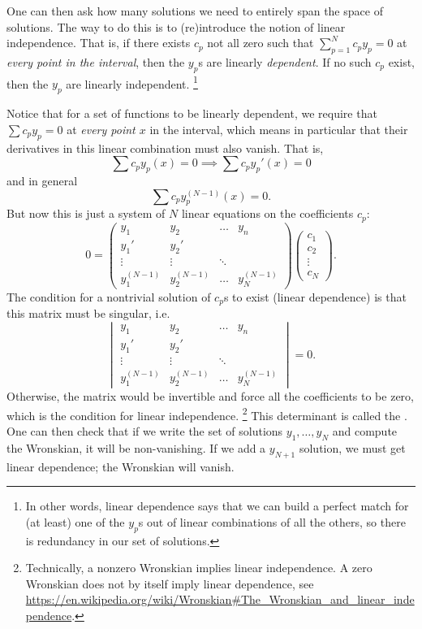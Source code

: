 One can then ask how many solutions we need to entirely span the space of solutions. The way to do this is to (re)introduce the notion of linear independence. That is, if there exists $c_p$ not all zero such that $\sum_{p=1}^N c_p y_p=0$ at \emph{every point in the interval}, then the $y_p$s are linearly \emph{dependent}. If no such $c_p$ exist, then the $y_p$ are linearly independent.%
    \footnote{In other words, linear dependence says that we can build a perfect match for (at least) one of the $y_p$s out of linear combinations of all the others, so there is redundancy in our set of solutions.}

Notice that for a set of functions to be linearly dependent, we require that $\sum c_p y_p=0$ at \emph{every point $x$} in the interval, which means in particular that their derivatives in this linear combination must also vanish. That is,
\begin{equation}
    \sum c_p y_p(x) = 0\implies \sum c_p y_p'(x) = 0
\end{equation}
and in general
\begin{equation}
    \sum c_p y_p^{(N-1)}(x) =0.
\end{equation}
But now this is just a system of $N$ linear equations on the coefficients $c_p$:
\begin{equation}
    0 = \begin{pmatrix}
    y_1 & y_2 & \ldots & y_n\\
    y_1' & y_2' && \\
    \vdots &\vdots&\ddots& \\
    y_1^{(N-1)} & y_2^{(N-1)} &\ldots &y_N^{(N-1)}
    \end{pmatrix}
    \begin{pmatrix}
    c_1 \\ c_2 \\ \vdots \\ c_N
    \end{pmatrix}.
\end{equation}
The condition for a nontrivial solution of $c_p$s to exist (linear dependence) is that this matrix must be singular, i.e.
\begin{equation}
    \begin{vmatrix}
    y_1 & y_2 & \ldots & y_n\\
    y_1' & y_2' && \\
    \vdots &\vdots&\ddots& \\
    y_1^{(N-1)} & y_2^{(N-1)} &\ldots &y_N^{(N-1)}
    \end{vmatrix}=0.
\end{equation}
Otherwise, the matrix would be invertible and force all the coefficients to be zero, which is the condition for linear independence.%
    \footnote{Technically, a nonzero Wronskian implies linear independence. A zero Wronskian does not by itself imply linear dependence, see \url{https://en.wikipedia.org/wiki/Wronskian\#The_Wronskian_and_linear_independence}.}
This determinant is called the . One can then check that if we write the set of solutions $y_1,\ldots, y_N$ and compute the Wronskian, it will be non-vanishing. If we add a $y_{N+1}$ solution, we must get linear dependence; the Wronskian will vanish.

